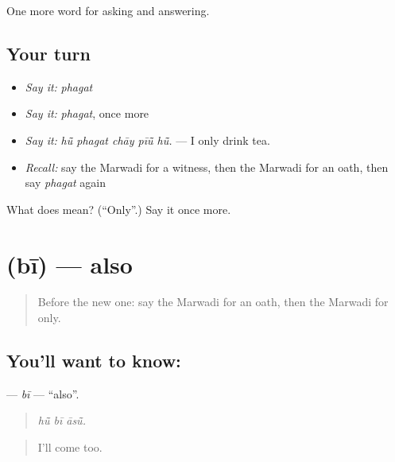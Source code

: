 \begin{grammarlens}[title={What you've built}]
One more word for asking and answering.
\end{grammarlens}

\subsection*{Your turn}
\begin{itemize}
\raggedright
  \item \emph{Say it:} \emph{phagat}
  \item \emph{Say it:} \emph{phagat}, once more
  \item \emph{Say it:} \emph{hū̃ phagat chāy pīū̃ hū̃.} — I only drink tea.
  \item \emph{Recall:} say the Marwadi for a witness, then the Marwadi for an oath, then say \emph{phagat} again
\end{itemize}

\begin{tcolorbox}[breakable,colback=teal!4,colframe=teal!35!black,title={Before you move on}]
What does  mean? (\textquotedblleft{}Only\textquotedblright{}.) Say it once more.
\end{tcolorbox}
\section[\texorpdfstring{\mw{बी} (bī)}{बी (bī)}]{ (bī) — also}

\label{lesson:MW-C272-bi}



\begin{quote}
Before the new one: say the Marwadi for an oath, then the Marwadi for only.
\end{quote}

\subsection*{You'll want to know: }
\textbf{} — \emph{bī} — \textquotedblleft{}also\textquotedblright{}.

\begin{quote}
  
\end{quote}

\begin{quote}
\emph{hū̃ bī āsū̃.}
\end{quote}

\begin{quote}
I'll come too.
\end{quote}

